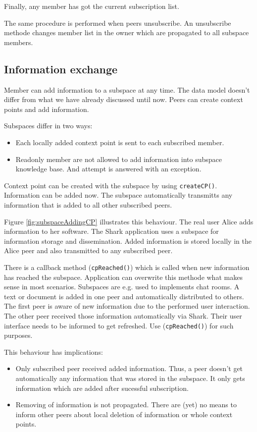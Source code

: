 Finally, any member has got the current subscription list.

The same procedure is performed when peers unsubscribe. An unsubscribe methode changes member list in the owner which are propagated to all subspace members.

\subsection{Information exchange}
Member can add information to a subspace at any time. The data model doesn't differ from what we have already discussed until now. Peers can create context points and add information.

Subspaces differ in two ways: 

\begin{itemize}
\item 
Each locally added context point is sent
to each subscribed member.
\item 
Readonly member are not allowed to add information into subspace knowledge
base. And attempt is answered with an exception.
\end{itemize}

Context point can be created with the subspace by using {\verb|createCP()|}. 
Information can be added now. The subspace automatically transmitts any 
information that is added to all other subscribed peers.

Figure \ref{fig:subspaceAddingCP} illustrates this behaviour. The real user Alice adds information to her software. The Shark application uses a subspace for information storage and dissemination. Added information is stored locally in the Alice peer and also transmitted to any subscribed peer.

There is a callback method ({\verb|cpReached()|}) which is called when new
information has reached the subspace. Application can overwrite this methode
what makes sense in most scenarios. Subspaces are e.g. used to implements 
chat rooms. A text or document is added in one peer and automatically 
distributed to others. The first peer is aware of new information due to
the performed user interaction. The other peer received those information
automatically via Shark. Their user interface needs to be informed to 
get refreshed. Use ({\verb|cpReached()|}) for such purposes.

This behaviour has implications:

\begin{itemize}
\item 
Only subscribed peer received added information. Thus, a peer doesn't get
automatically any information that was stored in the subspace. It only gets
information which are added after sucessful subscription.

\item 
Removing of information is not propagated. There are (yet) no means to inform
other peers about local deletion of information or whole context points.

\end{itemize}


